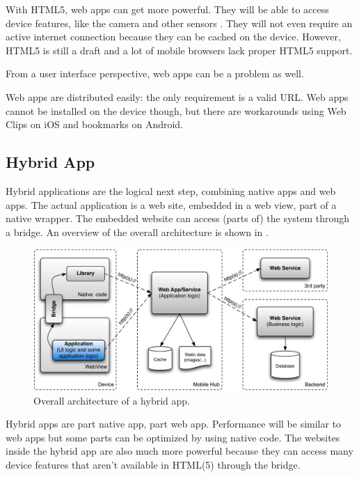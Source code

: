 \npar With HTML5, web apps can get more powerful. They will be able to access device features, like the camera and other sensors \citep{MobileHTML5}. They will not even require an active internet connection because they can be cached on the device. However, HTML5 is still a draft and a lot of mobile browsers lack proper HTML5 support.

\npar From a user interface perspective, web apps can be a problem as well. %

\npar Web apps are distributed easily: the only requirement is a valid URL. Web apps cannot be installed on the device though, but there are workarounds using Web Clips on iOS \citep{Safari:webclips} and bookmarks on Android. 

\subsection{Hybrid App}

\npar Hybrid applications are the logical next step, combining native apps and web apps. The actual application is a web site, embedded in a web view, part of a native wrapper. The embedded website can access (parts of) the system through a bridge. An overview of the overall architecture is shown in . 

\begin{figure}[h!]
    \begin{center}
        \includegraphics[width=\textwidth]{figs/hybrid.pdf}
        \caption{
            Overall architecture of a hybrid app.
        }
        \label{fig:hybrid}
    \end{center}
\end{figure}

\npar Hybrid apps are part native app, part web app. Performance will be similar to web apps but some parts can be optimized by using native code. The websites inside the hybrid app are also much more powerful because they can access many device features that aren't available in HTML(5) through the bridge.

